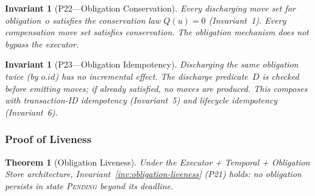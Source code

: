 \documentclass[11pt,a4paper]{article}
\newtheorem{theorem}[definition]{Theorem}
\newtheorem{invariant}[definition]{Invariant}
\begin{document}
\begin{invariant}[P22---Obligation Conservation]
\label{inv:obligation-conservation}
Every discharging move set for obligation~$o$ satisfies the conservation law $Q(u) = 0$ (Invariant~1). Every compensation move set satisfies conservation. The obligation mechanism does not bypass the executor.
\end{invariant}

\begin{invariant}[P23---Obligation Idempotency]
\label{inv:obligation-idempotency}
Discharging the same obligation twice (by $o.\mathit{id}$) has no incremental effect. The discharge predicate~$D$ is checked before emitting moves; if already satisfied, no moves are produced. This composes with transaction-ID idempotency (Invariant~5) and lifecycle idempotency (Invariant~6).
\end{invariant}

\subsubsection{Proof of Liveness}
\label{sec:liveness-proof}

\begin{theorem}[Obligation Liveness]
\label{thm:obligation-liveness}
Under the Executor + Temporal + Obligation Store architecture, Invariant~\ref{inv:obligation-liveness} (P21) holds: no obligation persists in state \textsc{Pending} beyond its deadline.
\end{theorem}
\end{document}

